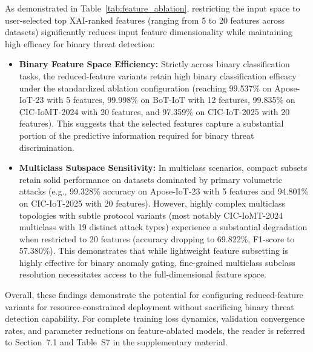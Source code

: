 \documentclass[a4paper,fleqn]{cas-sc}
\begin{document}
As demonstrated in Table~\ref{tab:feature_ablation}, restricting the input space to user-selected top XAI-ranked features (ranging from 5 to 20 features across datasets) significantly reduces input feature dimensionality while maintaining high efficacy for binary threat detection:
\begin{itemize}
    \item \textbf{Binary Feature Space Efficiency:} Strictly across binary classification tasks, the reduced-feature variants retain high binary classification efficacy under the standardized ablation configuration (reaching 99.537\% on Apose-IoT-23 with 5 features, 99.998\% on BoT-IoT with 12 features, 99.835\% on CIC-IoMT-2024 with 20 features, and 97.359\% on CIC-IoT-2025 with 20 features). This suggests that the selected features capture a substantial portion of the predictive information required for binary threat discrimination.
    \item \textbf{Multiclass Subspace Sensitivity:} In multiclass scenarios, compact subsets retain solid performance on datasets dominated by primary volumetric attacks (e.g., 99.328\% accuracy on Apose-IoT-23 with 5 features and 94.801\% on CIC-IoT-2025 with 20 features). However, highly complex multiclass topologies with subtle protocol variants (most notably CIC-IoMT-2024 multiclass with 19 distinct attack types) experience a substantial degradation when restricted to 20 features (accuracy dropping to 69.822\%, F1-score to 57.380\%). This demonstrates that while lightweight feature subsetting is highly effective for binary anomaly gating, fine-grained multiclass subclass resolution necessitates access to the full-dimensional feature space.
\end{itemize}
Overall, these findings demonstrate the potential for configuring reduced-feature variants for resource-constrained deployment without sacrificing binary threat detection capability. For complete training loss dynamics, validation convergence rates, and parameter reductions on feature-ablated models, the reader is referred to Section~7.1 and Table~S7 in the supplementary material.
\end{document}
